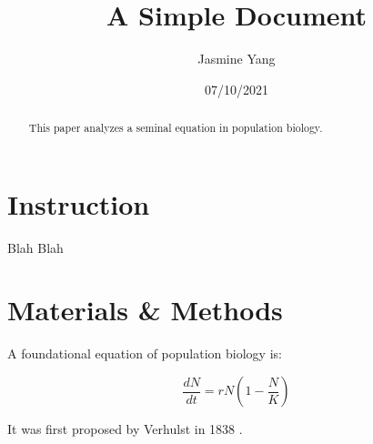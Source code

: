 \documentclass[12pt]{article}
\title{A Simple Document}
\author{Jasmine Yang}
\date{07/10/2021}
\begin{document}
    \maketitle

    \begin{abstract}
        This paper analyzes a seminal equation in population biology.
    \end{abstract}

    \section{Instruction}
        Blah Blah

    \section{Materials \& Methods}

    A foundational equation of population biology is:

    \begin{equation}
        \frac{dN}{dt} = r N (1 - \frac{N}{K})
    \end{equation}

    It was first proposed by Verhulst in 1838 \cite{verhulst1838notice}.

    

    
\end{document}
